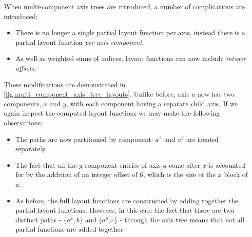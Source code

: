 \documentclass[thesis]{subfiles}
\begin{document}
When multi-component axis trees are introduced, a number of complications are introduced:

\begin{itemize}
  \item
    There is no longer a single partial layout function per axis, instead there is a partial layout function \emph{per axis component}.

  \item
    As well as weighted sums of indices, layout functions can now include \emph{integer offsets}.
\end{itemize}

These modifications are demonstrated in \cref{fig:multi_component_axis_tree_layouts}.
Unlike before, axis $a$ now has two components, $x$ and $y$, with each component having a separate child axis.
If we again inspect the computed layout functions we may make the following observations:

\begin{itemize}
  \item
    The paths are now partitioned by component: $a^x$ and $a^y$ are treated separately.

  \item
    The fact that all the $y$ component entries of axis $a$ come after $x$ is accounted for by the addition of an integer offset of 6, which is the size of the $x$ block of $a$.

  \item
    As before, the full layout functions are constructed by adding together the partial layout functions.
    However, in this case the fact that there are two distinct paths - $\{a^x, b\}$ and $\{a^y, c\}$ - through the axis tree means that not all partial functions are added together.
\end{itemize}
\end{document}
